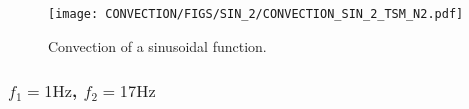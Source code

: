 \begin{figure}[htbp]
  \begin{center}
    \texttt{[image: CONVECTION/FIGS/SIN\_2/CONVECTION\_SIN\_2\_TSM\_N2.pdf]}
  \end{center}
  \caption{Convection of a sinusoidal function.}
  \label{fig:convection_sin_2_tsm_n_2}
\end{figure}

\subsubsection{$f_1 = 1 \text{Hz}$, $f_2 = 17 \text{Hz}$}


